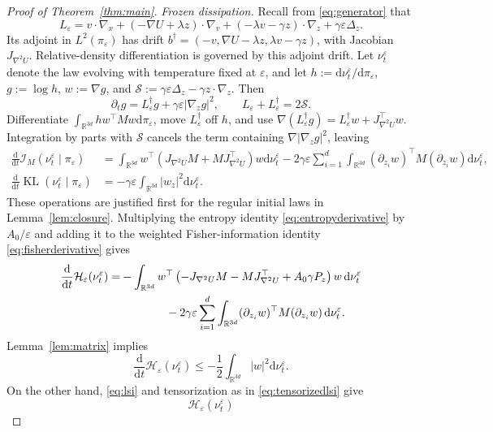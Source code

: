 \documentclass[10pt,a4paper]{amsart}
\newcommand{\KL}{\operatorname{KL}}
\newcommand{\R}{\mathbb R}
\newcommand{\cH}{\mathcal H}
\newcommand{\cI}{\mathcal I}
\newcommand{\dd}{\mathrm d}
\newcommand{\eps}{\varepsilon}
\theoremstyle{plain}
\theoremstyle{definition}
\begin{document}
\begin{proof}[Proof of Theorem~\ref{thm:main}]
\emph{Frozen dissipation.}
Recall from \eqref{eq:generator} that
\[
 L_\eps=v\cdot\nabla_x+(-\nabla U+\lambda z)\cdot\nabla_v
 +(-\lambda v-\gamma z)\cdot\nabla_z+\gamma\eps\Delta_z.
\]
Its adjoint in $L^2(\pi_\eps)$
has drift
$b^\dagger=(-v,\nabla U-\lambda z,\lambda v-\gamma z)$, with Jacobian
$J_{\nabla^2U}$. Relative-density differentiation is governed by this adjoint
drift. Let $\nu_t^\eps$ denote the
law evolving with temperature fixed at $\eps$, and let
$h:=\dd\nu_t^\eps/\dd\pi_\eps$, $g:=\log h$, $w:=\nabla g$, and
$\mathcal S:=\gamma\eps\Delta_z-\gamma z\cdot\nabla_z$. Then
\[
 \partial_t g=L_\eps^\dagger g+\gamma\eps|\nabla_z g|^2,
 \qquad L_\eps+L_\eps^\dagger=2\mathcal S.
\]
Differentiate $\int_{\R^{3d}} h w^\top M w\dd\pi_\eps$, move $L_\eps^\dagger$
off $h$, and use
$\nabla(L_\eps^\dagger g)=L_\eps^\dagger w+J_{\nabla^2U}^\top w$.
Integration by parts with $\mathcal S$ cancels the term containing
$\nabla|\nabla_z g|^2$, leaving
\begin{subequations}\label{eq:fisherentropyderivatives}
\begin{align}
 \frac{\dd}{\dd t}\cI_M(\nu_t^\eps\mid\pi_\eps)
 &=\int_{\R^{3d}} w^\top\left(J_{\nabla^2U}M+MJ_{\nabla^2U}^\top\right)w\dd\nu_t^\eps
   -2\gamma\eps\sum_{i=1}^{d}\int_{\R^{3d}}(\partial_{z_i}w)^\top M(\partial_{z_i}w)\dd\nu_t^\eps,
   \label{eq:fisherderivative}\\
 \frac{\dd}{\dd t}\KL(\nu_t^\eps\mid\pi_\eps)
 &=-\gamma\eps\int_{\R^{3d}}|w_z|^2\dd\nu_t^\eps.
   \label{eq:entropyderivative}
\end{align}
\end{subequations}
These operations are justified first for the regular initial laws in
Lemma~\ref{lem:closure}. Multiplying the entropy identity
\eqref{eq:entropyderivative}
by $A_0/\eps$ and adding it to the weighted Fisher-information identity
\eqref{eq:fisherderivative}
gives
\begin{align}\label{eq:frozenidentity}
 \frac{\dd}{\dd t}\cH_\eps(\nu_t^\eps)
 =&-\int_{\R^{3d}} w^\top\left(-J_{\nabla^2U}M-MJ_{\nabla^2U}^\top
                         +A_0\gamma P_z\right)w\,\dd\nu_t^\eps\notag\\
 &\qquad\qquad-2\gamma\eps\sum_{i=1}^d\int_{\R^{3d}}
           (\partial_{z_i}w)^\top M(\partial_{z_i}w)\,\dd\nu_t^\eps.
\end{align}
Lemma~\ref{lem:matrix} implies
\[
 \frac{\dd}{\dd t}\cH_\eps(\nu_t^\eps)
 \leq-\frac12\int_{\R^{3d}}|w|^2\dd\nu_t^\eps.
\]
On the other hand, \eqref{eq:lsi} and tensorization as in
\eqref{eq:tensorizedlsi} give
\[
 \cH_\eps(\nu_t^\eps)
\]
\end{proof}
\end{document}
